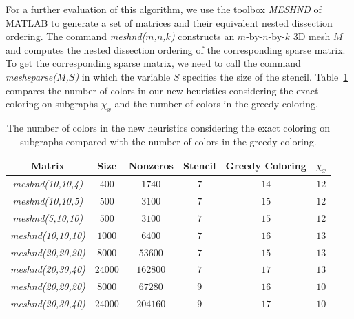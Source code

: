 \documentclass[12pt, twoside,a4paper,toc=bibliography]{scrbook}
\begin{document}
For a further evaluation of this algorithm, we use the toolbox \textit{MESHND}
of MATLAB to generate a set of matrices and their equivalent nested dissection ordering.
The command \textit{meshnd($m$,$n$,$k$)} constructs an $m$-by-$n$-by-$k$ 3D mesh $M$
and computes the nested dissection ordering of the corresponding sparse matrix.
To get the corresponding sparse matrix, we need to call the command 
\textit{meshsparse($M$,$S$)} in which the variable $S$ specifies the size
of the stencil.
Table~\ref{table.exact.greedy} compares the number of colors in our new 
heuristics considering the exact coloring on subgraphs $\chi_{x}$ and 
the number of colors in the greedy coloring.
\begin{table}
\centering
\begin{tabular}{|c|c|c|c|c|c|}
\hline
Matrix & Size & Nonzeros & Stencil & Greedy Coloring & $\chi_{x}$ \\\hline
\textit{meshnd(10,10,4)} & $400$ & $1740$ & $7$ & $14$ & $12$\\\hline
\textit{meshnd(10,10,5)} & $500$ & $3100$ & $7$ & $15$ & $12$\\\hline
\textit{meshnd(5,10,10)} & $500$ & $3100$ & $7$ & $15$ & $12$\\\hline
\textit{meshnd(10,10,10)} & $1000$ & $6400$ & $7$ & $16$ & $13$\\\hline
\textit{meshnd(20,20,20)} & $8000$ & $53600$ & $7$ & $15$ & $13$\\\hline
\textit{meshnd(20,30,40)} & $24000$ & $162800$ & $7$ & $17$ & $13$\\\hline
\textit{meshnd(20,20,20)} & $8000$ & $67280$ & $9$ & $16$ & $10$\\\hline
\textit{meshnd(20,30,40)} & $24000$ & $204160$ & $9$ & $17$ & $10$\\\hline
\end{tabular}
\caption{The number of colors in the new heuristics considering the exact coloring on subgraphs
compared with the number of colors in the greedy coloring.}
\label{table.exact.greedy}
\end{table}



\end{document}

